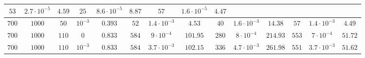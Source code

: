\documentclass[twocolumn]{svjour3}
\begin{document}
\begin{table*} [!htp]
\begin{center}
\begin{tabular}{|c|c|c|c|c|c|c|c|c|c|c|c|c|c}
\multicolumn{1}{|c}{$53$} & \multicolumn{1}{c}{$2.7 \cdot 10^{-5}$} & \multicolumn{1}{c|}{$4.59$} &
\multicolumn{1}{|c}{$25$} & \multicolumn{1}{c}{$8.6 \cdot 10^{-5}$} & \multicolumn{1}{c}{$8.87$} &
\multicolumn{1}{|c}{$57$} & \multicolumn{1}{c}{$1.6 \cdot 10^{-5}$} & \multicolumn{1}{c}{$\mathbf{4.47}$} \\
\hline
\multicolumn{1}{c}{$700$} & \multicolumn{1}{c}{$1000$} & \multicolumn{1}{c}{$50$}  & \multicolumn{1}{c|}{$10^{-3}$} & $ 0.393 $ & 
\multicolumn{1}{|c}{$52$} & \multicolumn{1}{c}{$1.4 \cdot 10^{-3}$} & \multicolumn{1}{c|}{$4.53$} &
\multicolumn{1}{|c}{$40$} & \multicolumn{1}{c}{$1.6 \cdot 10^{-3}$} & \multicolumn{1}{c}{$14.38$} &
\multicolumn{1}{|c}{$57$} & \multicolumn{1}{c}{$1.4 \cdot 10^{-3}$} & \multicolumn{1}{c}{$\mathbf{4.49}$} \\
\hline
\multicolumn{1}{c}{$700$} & \multicolumn{1}{c}{$1000$} & \multicolumn{1}{c}{$110$}  & \multicolumn{1}{c|}{$0$} & $ 0.833 $ & 
\multicolumn{1}{|c}{$584$} & \multicolumn{1}{c}{$9 \cdot 10^{-4}$} & \multicolumn{1}{c|}{$101.95$} &
\multicolumn{1}{|c}{$280$} & \multicolumn{1}{c}{$8 \cdot 10^{-4}$} & \multicolumn{1}{c}{$214.93$} &
\multicolumn{1}{|c}{$553$} & \multicolumn{1}{c}{$7 \cdot 10^{-4}$} & \multicolumn{1}{c}{$\mathbf{51.72}$} \\
\hline
\multicolumn{1}{c}{$700$} & \multicolumn{1}{c}{$1000$} & \multicolumn{1}{c}{$110$}  & \multicolumn{1}{c|}{$10^{-3}$} & $ 0.833 $ & 
\multicolumn{1}{|c}{$584$} & \multicolumn{1}{c}{$3.7 \cdot 10^{-3}$} & \multicolumn{1}{c|}{$102.15$} &
\multicolumn{1}{|c}{$336$} & \multicolumn{1}{c}{$4.7 \cdot 10^{-3}$} & \multicolumn{1}{c}{$261.98$} &
\multicolumn{1}{|c}{$551$} & \multicolumn{1}{c}{$3.7 \cdot 10^{-3}$} & \multicolumn{1}{c}{$\mathbf{51.62}$} \\
\hline
\end{tabular}
\end{center}
\end{table*}
\end{document}
